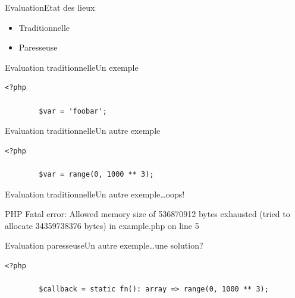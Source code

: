 \begin{frame}{Evaluation}{Etat des lieux}
    \begin{itemize}[<+->]
        \item<1-> Traditionnelle


        \item<2-> Paresseuse

    \end{itemize}
\end{frame}

\begin{frame}[fragile]{Evaluation traditionnelle}{Un exemple}
    \begin{lstlisting}[firstnumber=1]
        <?php

        $var = 'foobar';
    \end{lstlisting}
\end{frame}

\begin{frame}[fragile]{Evaluation traditionnelle}{Un autre exemple}
    \begin{lstlisting}[firstnumber=1]
        <?php

        $var = range(0, 1000 ** 3);
    \end{lstlisting}
\end{frame}

\begin{frame}[fragile]{Evaluation traditionnelle}{Un autre exemple\ldots oops!}
    \begin{spverbatim}
        PHP Fatal error: Allowed memory size of 536870912 bytes exhausted (tried to allocate 34359738376 bytes) in example.php on line 5
    \end{spverbatim}
\end{frame}

\begin{frame}[fragile]{Evaluation paresseuse}{Un autre exemple\ldots une solution?}
    \begin{lstlisting}[firstnumber=1]
        <?php

        $callback = static fn(): array => range(0, 1000 ** 3);
    \end{lstlisting}
\end{frame}

